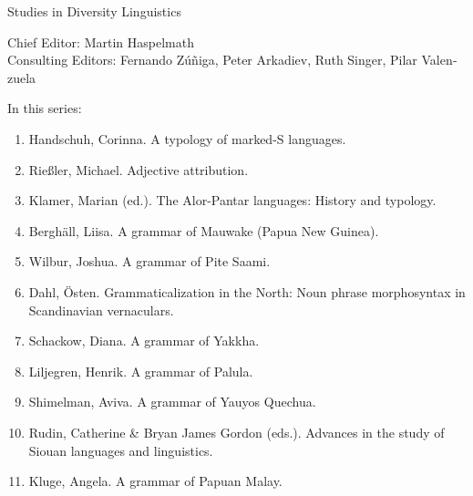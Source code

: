 {\large Studies in Diversity Linguistics}

\bigskip

Chief Editor: Martin Haspelmath \\
Consulting Editors: Fernando Zúñiga, Peter Arkadiev, Ruth Singer, Pilar Valen­zuela

\bigskip

In this series:

\begin{enumerate}
\item Handschuh, Corinna. A typology of marked-S languages.
\item Rießler, Michael. Adjective attribution.
\item Klamer, Marian (ed.). The Alor-Pantar languages: History and typology.
\item Berghäll, Liisa. A grammar of Mauwake (Papua New Guinea).
\item Wilbur, Joshua. A grammar of Pite Saami.
\item Dahl, Östen. Grammaticalization in the North: Noun phrase morphosyntax in Scandinavian vernaculars.
\item Schackow, Diana.    A grammar of Yakkha.
\item Liljegren, Henrik. A grammar of Palula.
\item Shimelman, Aviva. A grammar of Yauyos Quechua. 
\item Rudin, Catherine \& Bryan James Gordon (eds.). Advances in the study of Siouan languages and linguistics.
\item Kluge, Angela. A grammar of Papuan Malay. 
\end{enumerate}



